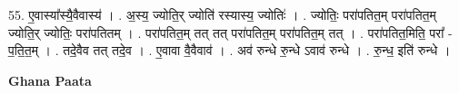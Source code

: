\documentclass[17pt]{extarticle}
\begin{document}
55. ए॒वास्या᳚स्यै॒वैवास्य॑ । . अ॒स्य॒ ज्योति॒र् ज्योति॑ रस्यास्य॒ ज्योतिः॑ । . ज्योतिः॒ परा॑पतित॒म् परा॑पतित॒म् ज्योति॒र् ज्योतिः॒ परा॑पतितम् । . परा॑पतित॒म् तत् तत् परा॑पतित॒म् परा॑पतित॒म् तत् । . परा॑पतित॒मिति॒ परा᳚ - प॒ति॒त॒म् । . तदे॒वैव तत् तदे॒व । . ए॒वावा वै॒वैवाव॑ । . अव॑ रुन्धे रु॒न्धे ऽवाव॑ रुन्धे । . रु॒न्ध॒ इति॑ रुन्धे । \newline

\textbf{Ghana Paata } \newline
\end{document}
